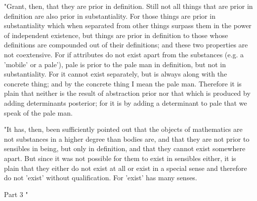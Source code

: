 "Grant, then, that they are prior in definition. Still not all things
that are prior in definition are also prior in substantiality. For
those things are prior in substantiality which when separated from
other things surpass them in the power of independent existence, but
things are prior in definition to those whose definitions are compounded
out of their definitions; and these two properties are not coextensive.
For if attributes do not exist apart from the substances (e.g. a 'mobile'
or a pale'), pale is prior to the pale man in definition, but not
in substantiality. For it cannot exist separately, but is always along
with the concrete thing; and by the concrete thing I mean the pale
man. Therefore it is plain that neither is the result of abstraction
prior nor that which is produced by adding determinants posterior;
for it is by adding a determinant to pale that we speak of the pale
man. 

"It has, then, been sufficiently pointed out that the objects of mathematics
are not substances in a higher degree than bodies are, and that they
are not prior to sensibles in being, but only in definition, and that
they cannot exist somewhere apart. But since it was not possible for
them to exist in sensibles either, it is plain that they either do
not exist at all or exist in a special sense and therefore do not
'exist' without qualification. For 'exist' has many senses.

Part 3 "

